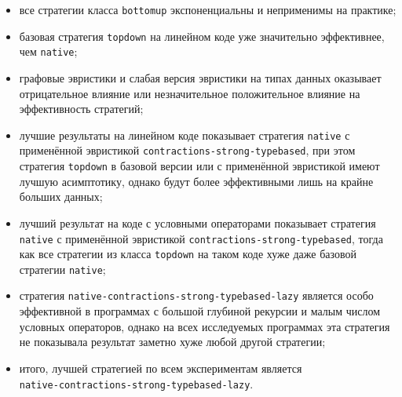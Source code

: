 \documentclass[../thesis.tex]{subfiles}
\begin{document}
\begin{itemize}
    \item все стратегии класса \texttt{bottomup} экспоненциальны и неприменимы на практике; 
    \item базовая стратегия \texttt{topdown} на линейном коде уже значительно эффективнее, чем \texttt{native}; 
    \item графовые эвристики и слабая версия эвристики на типах данных оказывает отрицательное влияние или незначительное положительное влияние на эффективность стратегий;
    \item лучшие результаты на линейном коде показывает стратегия \texttt{native} с применённой эвристикой \texttt{contractions-strong-typebased}, при этом стратегия \texttt{topdown} в базовой версии или с применённой эвристикой имеют лучшую асимптотику, однако будут более эффективными лишь на крайне больших данных;
    \item лучший результат на коде с условными операторами показывает стратегия \texttt{native} с применённой эвристикой \texttt{contractions-strong-typebased}, тогда как все стратегии из класса \texttt{topdown} на таком коде хуже даже базовой стратегии \texttt{native};
    \item стратегия \texttt{native-contractions-strong-typebased-lazy} является особо эффективной в программах с большой глубиной рекурсии и малым числом условных операторов, однако на всех исследуемых программах эта стратегия не показывала результат заметно хуже любой другой стратегии;
    \item итого, лучшей стратегией по всем экспериментам является \\\texttt{native-contractions-strong-typebased-lazy}.
\end{itemize}
\end{document}
